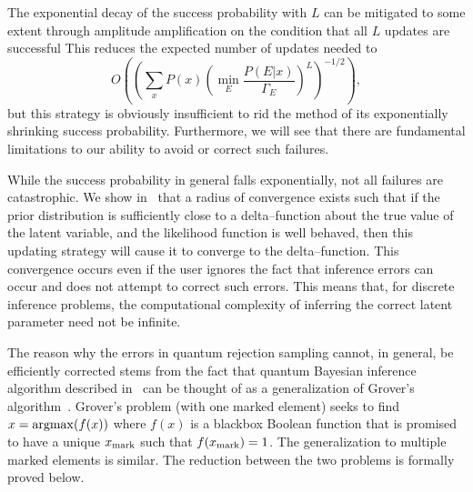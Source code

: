 \documentclass[aps,amsmath,onecolumn,amssymb,notitlepage]{revtex4-1}
\begin{document}
The exponential decay of the success probability with $L$ can be mitigated to some extent through amplitude amplification on the condition that all $L$ updates are successful  This reduces the expected number of updates needed to 
\begin{equation}
O\left(\left({\sum_x P(x) \left(\min_E \frac{P(E|x)}{\Gamma_E}\right)^L}\right)^{-1/2}\right),
\end{equation}
but this strategy is obviously insufficient to rid the method of its exponentially shrinking success probability.  Furthermore, we will see that there are fundamental limitations to our ability to avoid or correct such failures.
%


While the success probability in general falls exponentially, not all failures are catastrophic.  We show in~ that a radius of convergence exists such that if the prior distribution is sufficiently close to a delta--function about the true value of the latent variable, and the likelihood function is well behaved, then this updating strategy will cause it to converge to the delta--function.  This convergence occurs even if the user ignores the fact that inference errors can occur and does not attempt to correct such errors.  This means that, for discrete inference problems, the computational complexity of inferring the correct latent parameter need not be infinite.

The reason why the errors in quantum rejection sampling cannot, in general, be efficiently corrected stems from the fact that quantum Bayesian inference algorithm described in~ can be thought of as a generalization of Grover's algorithm~\cite{Gro96}.  Grover's problem (with one marked element) seeks to find $x = {\rm argmax}( f(x))$ where $f(x)$ is a blackbox Boolean function that is promised to have a unique $x_{\rm mark}$ such that $f(x_{\rm mark})=1$.  The generalization to multiple marked elements is similar.  The reduction between the two problems is formally proved below.
\end{document}
